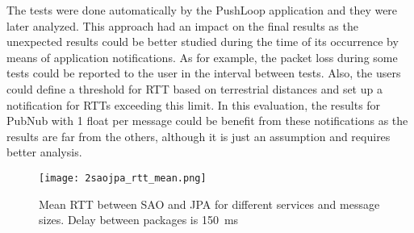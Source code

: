 The tests were done automatically by the PushLoop application and they were later analyzed.
This approach had an impact on the final results as the unexpected results could be better studied during the time of its occurrence by means of application notifications.
As for example, the packet loss during some tests could be reported to the user in the interval between tests.
Also, the users could define a threshold for RTT based on terrestrial distances and set up a notification for RTTs exceeding this limit.
In this evaluation, the results for PubNub with 1 float per message could be benefit from these notifications as the results are far from the others, although it is just an assumption and requires better analysis.

\begin{figure}[!ht]
	\centering
	\texttt{[image: 2saojpa\_rtt\_mean.png]}
	\caption{Mean RTT between SAO and JPA for different services and message sizes. Delay between packages is 150~ms}
	\label{fig:second-sao-jpa-rtt}
\end{figure}

